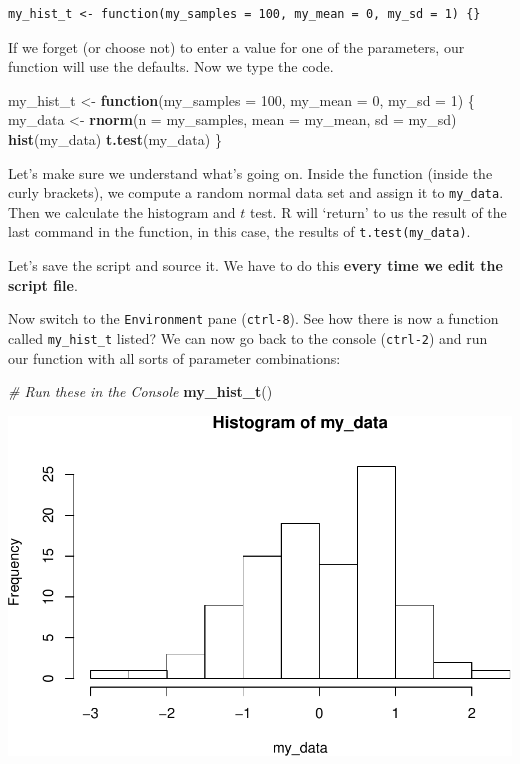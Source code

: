\documentclass[]{article}
\newenvironment{Shaded}{\begin{snugshade}}{\end{snugshade}}
\newcommand{\KeywordTok}[1]{\textcolor[rgb]{0.13,0.29,0.53}{\textbf{#1}}}
\newcommand{\DataTypeTok}[1]{\textcolor[rgb]{0.13,0.29,0.53}{#1}}
\newcommand{\DecValTok}[1]{\textcolor[rgb]{0.00,0.00,0.81}{#1}}
\newcommand{\StringTok}[1]{\textcolor[rgb]{0.31,0.60,0.02}{#1}}
\newcommand{\CommentTok}[1]{\textcolor[rgb]{0.56,0.35,0.01}{\textit{#1}}}
\newcommand{\ControlFlowTok}[1]{\textcolor[rgb]{0.13,0.29,0.53}{\textbf{#1}}}
\newcommand{\NormalTok}[1]{#1}
\begin{document}
\begin{verbatim}
my_hist_t <- function(my_samples = 100, my_mean = 0, my_sd = 1) {}
\end{verbatim}

If we forget (or choose not) to enter a value for one of the parameters,
our function will use the defaults. Now we type the code.

\begin{Shaded}
\begin{Highlighting}[]
\NormalTok{my_hist_t <-}\StringTok{ }\ControlFlowTok{function}\NormalTok{(}\DataTypeTok{my_samples =} \DecValTok{100}\NormalTok{, }\DataTypeTok{my_mean =} \DecValTok{0}\NormalTok{, }\DataTypeTok{my_sd =} \DecValTok{1}\NormalTok{) \{}
\NormalTok{    my_data <-}\StringTok{ }\KeywordTok{rnorm}\NormalTok{(}\DataTypeTok{n =}\NormalTok{ my_samples, }\DataTypeTok{mean =}\NormalTok{ my_mean, }\DataTypeTok{sd =}\NormalTok{ my_sd)}
    \KeywordTok{hist}\NormalTok{(my_data)}
    \KeywordTok{t.test}\NormalTok{(my_data)}
\NormalTok{\}}
\end{Highlighting}
\end{Shaded}

Let's make sure we understand what's going on. Inside the function
(inside the curly brackets), we compute a random normal data set and
assign it to \texttt{my\_data}. Then we calculate the histogram and
\(t\) test. R will `return' to us the result of the last command in the
function, in this case, the results of \texttt{t.test(my\_data)}.

Let's save the script and source it. We have to do this \textbf{every
time we edit the script file}.

Now switch to the \texttt{Environment} pane (\texttt{ctrl-8}). See how
there is now a function called \texttt{my\_hist\_t} listed? We can now
go back to the console (\texttt{ctrl-2}) and run our function with all
sorts of parameter combinations:

\begin{Shaded}
\begin{Highlighting}[]
\CommentTok{# Run these in the Console}
\KeywordTok{my_hist_t}\NormalTok{()}
\end{Highlighting}
\end{Shaded}

\includegraphics{slow-r_files/figure-latex/unnamed-chunk-54-1.pdf}
\end{document}
